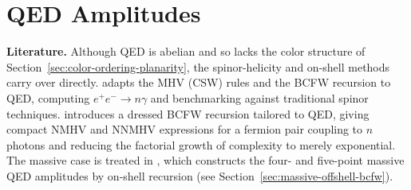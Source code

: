 \section{QED Amplitudes}
\label{sec:qed-amplitudes}



\textbf{Literature.} Although QED is abelian and so lacks the color structure of Section~\ref{sec:color-ordering-planarity}, the spinor-helicity and on-shell methods carry over directly. \autocite{Ozeren:2005mp} adapts the MHV (CSW) rules and the BCFW recursion to QED, computing $e^+ e^- \to n\gamma$ and benchmarking against traditional spinor techniques. \autocite{Badger:2010eq} introduces a dressed BCFW recursion tailored to QED, giving compact NMHV and NNMHV expressions for a fermion pair coupling to $n$ photons and reducing the factorial growth of complexity to merely exponential. The massive case is treated in \autocite{Ema:2024vww}, which constructs the four- and five-point massive QED amplitudes by on-shell recursion (see Section~\ref{sec:massive-offshell-bcfw}).